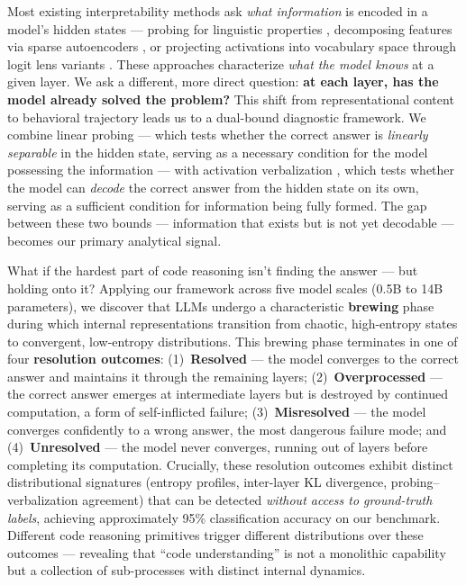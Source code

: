 Most existing interpretability methods ask \textit{what information} is encoded in a model's hidden states --- probing for linguistic properties \citep{belinkov2017neural}, decomposing features via sparse autoencoders \citep{cunningham2023sparse}, or projecting activations into vocabulary space through logit lens variants \citep{nostalgebraist2020logit, belrose2023eliciting}. These approaches characterize \textit{what the model knows} at a given layer. We ask a different, more direct question: \textbf{at each layer, has the model already solved the problem?} This shift from representational content to behavioral trajectory leads us to a dual-bound diagnostic framework. We combine linear probing --- which tests whether the correct answer is \textit{linearly separable} in the hidden state, serving as a necessary condition for the model possessing the information --- with activation verbalization \citep{ghandeharioun2024patchscopes}, which tests whether the model can \textit{decode} the correct answer from the hidden state on its own, serving as a sufficient condition for information being fully formed. The gap between these two bounds --- information that exists but is not yet decodable --- becomes our primary analytical signal.

What if the hardest part of code reasoning isn't finding the answer --- but holding onto it? Applying our framework across five model scales (0.5B to 14B parameters), we discover that LLMs undergo a characteristic \textbf{brewing} phase during which internal representations transition from chaotic, high-entropy states to convergent, low-entropy distributions. This brewing phase terminates in one of four \textbf{resolution outcomes}: (1)~\textbf{Resolved} --- the model converges to the correct answer and maintains it through the remaining layers; (2)~\textbf{Overprocessed} --- the correct answer emerges at intermediate layers but is destroyed by continued computation, a form of self-inflicted failure; (3)~\textbf{Misresolved} --- the model converges confidently to a wrong answer, the most dangerous failure mode; and (4)~\textbf{Unresolved} --- the model never converges, running out of layers before completing its computation. Crucially, these resolution outcomes exhibit distinct distributional signatures (entropy profiles, inter-layer KL divergence, probing--verbalization agreement) that can be detected \textit{without access to ground-truth labels}, achieving approximately 95\% classification accuracy on our benchmark. Different code reasoning primitives trigger different distributions over these outcomes --- revealing that ``code understanding'' is not a monolithic capability but a collection of sub-processes with distinct internal dynamics.

